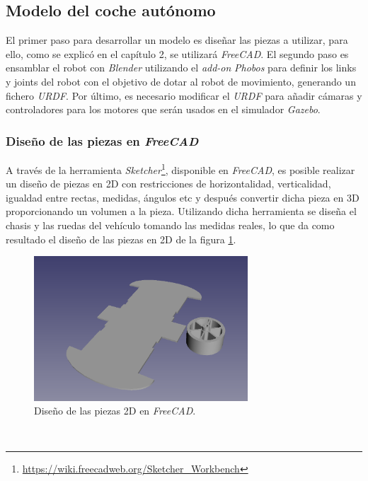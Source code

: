 \subsection{Modelo del coche autónomo}
El primer paso para desarrollar un modelo es diseñar las piezas a utilizar, para ello, como se explicó en el capítulo 2, se utilizará \textit{FreeCAD}. El segundo paso es ensamblar el robot con \textit{Blender} utilizando el \textit{add-on} \textit{Phobos} para definir los links y joints del robot con el objetivo de dotar al robot de movimiento, generando un fichero \textit{URDF}. Por último, es necesario modificar el \textit{URDF} para añadir cámaras y controladores para los motores que serán usados en el simulador \textit{Gazebo}.\\

\subsubsection{Diseño de las piezas en \textit{FreeCAD}}

A través de la herramienta \textit{Sketcher}\footnote{\url{https://wiki.freecadweb.org/Sketcher_Workbench}}, disponible en \textit{FreeCAD}, es posible realizar un diseño de piezas en 2D con restricciones de horizontalidad, verticalidad, igualdad entre rectas, medidas, ángulos etc y después convertir dicha pieza en 3D proporcionando un volumen a la pieza. Utilizando dicha herramienta se diseña el chasis y las ruedas del vehículo tomando las medidas reales, lo que da como resultado el diseño de las piezas en 2D de la figura \ref{fig:design2Dfreecad}.\\

\begin{figure} [h!]
	\begin{center}
		\includegraphics[width=8cm]{figs/freecad}
	\end{center}
	\caption{Diseño de las piezas 2D en \textit{FreeCAD}.}
	\label{fig:design2Dfreecad}
\end{figure}\

